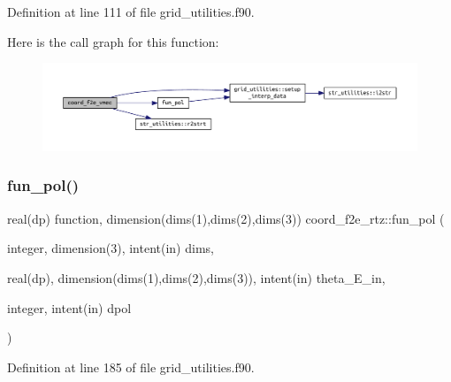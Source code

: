 Definition at line 111 of file grid\+\_\+utilities.\+f90.

Here is the call graph for this function\+:
\nopagebreak
\begin{figure}[H]
\begin{center}
\leavevmode
\includegraphics[width=350pt]{grid__utilities_8f90_aa4643f558c5d0e6149c4a8cbd289777d_cgraph}
\end{center}
\end{figure}
\mbox{\label{grid__utilities_8f90_a38078beae178a5dcd051e2ed858d4d35}} 
\subsubsection{\texorpdfstring{fun\+\_\+pol()}{fun\_pol()}}
{\footnotesize\ttfamily real(dp) function, dimension(dims(1),dims(2),dims(3)) coord\+\_\+f2e\+\_\+rtz\+::fun\+\_\+pol (\begin{DoxyParamCaption}\item[{integer, dimension(3), intent(in)}]{dims,  }\item[{real(dp), dimension(dims(1),dims(2),dims(3)), intent(in)}]{theta\+\_\+\+E\+\_\+in,  }\item[{integer, intent(in)}]{dpol }\end{DoxyParamCaption})}



Definition at line 185 of file grid\+\_\+utilities.\+f90.

